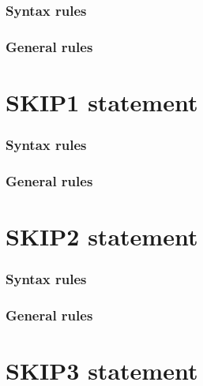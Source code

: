 \subsubsection{Syntax rules}

\subsubsection{General rules}

\section{SKIP1 statement}

\begin{syntax}[\miscextcolour]
\end{syntax}

\subsubsection{Syntax rules}

\subsubsection{General rules}

\section{SKIP2 statement}

\begin{syntax}[\miscextcolour]
\end{syntax}

\subsubsection{Syntax rules}

\subsubsection{General rules}

\section{SKIP3 statement}

\begin{syntax}[\miscextcolour]
\end{syntax}

